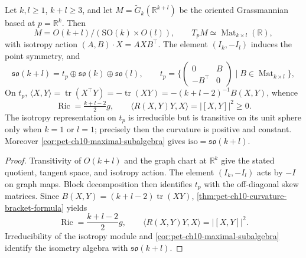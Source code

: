 \begin{example}
  \label{ex:pet-ch10-compact-grassmannian}

  Let $k,l\ge1$, $k+l\ge3$, and let
  $M=\widetilde G_k(\mathbb R^{k+l})$ be the oriented Grassmannian based at
  $p=\mathbb R^k$. Then
  \[
    M=O(k+l)/(\mathrm{SO}(k)\times O(l)),\qquad
    T_pM\simeq\operatorname{Mat}_{k\times l}(\mathbb R),
  \]
  with isotropy action $(A,B)\cdot X=AXB^\top$. The element $(I_k,-I_l)$
  induces the point symmetry, and
  \[
    \mathfrak{so}(k+l)=t_p\oplus\mathfrak{so}(k)\oplus\mathfrak{so}(l),
    \qquad
    t_p=\Big\{\begin{pmatrix}0&B\\-B^\top&0\end{pmatrix}\mid B\in\operatorname{Mat}_{k\times l}\Big\},
  \]
  On $t_p$,
  $\langle X,Y\rangle=\operatorname{tr}(X^\top Y)=-\operatorname{tr}(XY)
  =-(k+l-2)^{-1}B(X,Y)$, whence
  \[
    \operatorname{Ric}=\tfrac{k+l-2}2g,\qquad
    \langle R(X,Y)Y,X\rangle=|[X,Y]|^2\ge0.
  \]
  The isotropy representation on $t_p$ is irreducible but is transitive on its
  unit sphere only when $k=1$ or $l=1$; precisely then the curvature is positive
  and constant. Moreover
  \cref{cor:pet-ch10-maximal-subalgebra} gives
  $\mathrm{iso}=\mathfrak{so}(k+l)$.
\end{example}
\begin{proof}
  \sketch
  Transitivity of $O(k+l)$ and the graph chart at $\mathbb R^k$ give the stated
  quotient, tangent space, and isotropy action. The element $(I_k,-I_l)$ acts
  by $-I$ on graph maps. Block decomposition then identifies $t_p$ with the
  off-diagonal skew matrices. Since
  $B(X,Y)=(k+l-2)\operatorname{tr}(XY)$,
  \cref{thm:pet-ch10-curvature-bracket-formula} yields
  \[
    \operatorname{Ric}=\frac{k+l-2}{2}g,\qquad
    \langle R(X,Y)Y,X\rangle=|[X,Y]|^2.
  \]
  Irreducibility of the isotropy module and
  \cref{cor:pet-ch10-maximal-subalgebra} identify the isometry algebra with
  $\mathfrak{so}(k+l)$.
\end{proof}

